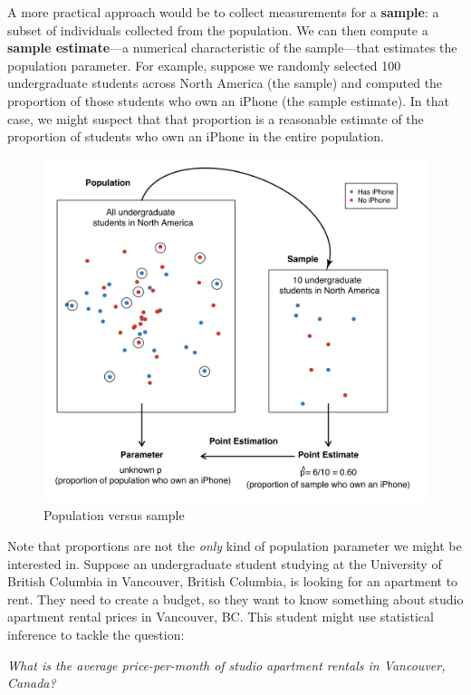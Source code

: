 \documentclass[
]{krantz}
\begin{document}
A more practical approach would be to collect measurements for a \textbf{sample}: a subset of
individuals collected from the population. We can then compute a \textbf{sample estimate}---a numerical
characteristic of the sample---that estimates the population parameter. For example, suppose we randomly selected 100 undergraduate students across North America (the sample) and computed the proportion of those
students who own an iPhone (the sample estimate). In that case, we might suspect that that proportion is a reasonable estimate of the proportion of students who own an iPhone in the entire population.

\begin{figure}
\includegraphics[width=12.24in]{img/population_vs_sample} \caption{Population versus sample}\label{fig:11-population-vs-sample}
\end{figure}

Note that proportions are not the \emph{only} kind of population parameter we might be interested in. Suppose an undergraduate student studying at the University of British Columbia in Vancouver, British Columbia, is looking for an apartment to rent. They need to create a budget, so they want to know something about studio apartment rental prices in Vancouver, BC. This student might use statistical inference to tackle the question:

\emph{What is the average price-per-month of studio apartment rentals in Vancouver, Canada?}
\end{document}
